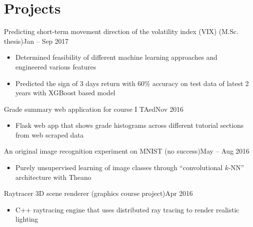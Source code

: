 \documentclass[10pt,letterpaper]{article}
\newcommand*\textmb[1]{\fontseries{b}\selectfont#1\fontseries{m}\selectfont}
\newcommand*\position[1]{\textmb{#1}}
\newcommand*\timespan\position
\begin{document}
\section*{Projects}
\position{Predicting short-term movement direction of the volatility index (VIX)} (M.Sc. thesis)\hfill\timespan{Jan -- Sep 2017}
\begin{itemize}
\item Determined feasibility of different machine learning approaches and engineered various features
\item Predicted the sign of 3 days return with 60\% accuracy on test data of latest 2 years with XGBoost based model
\end{itemize}
\position{Grade summary web application for course I TAed}\hfill\timespan{Nov 2016}
\begin{itemize}
\item Flask web app that shows grade histograms across different tutorial sections from web scraped data
\end{itemize}
\position{An original image recognition experiment on MNIST} (no success)\hfill\timespan{May -- Aug 2016}
\begin{itemize}
\item Purely unsupervised learning of image classes through ``convolutional \(k\)-NN'' architecture with Theano
\end{itemize}
\position{Raytracer 3D scene renderer} (graphics course project)\hfill\timespan{Apr 2016}
\begin{itemize}
\item C++ raytracing engine that uses distributed ray tracing to render realistic lighting
\end{itemize}
\end{document}
